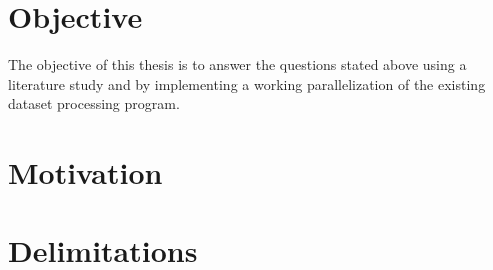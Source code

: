 \section{Objective}
The objective of this thesis is to answer the questions stated above using a literature study and by implementing a working parallelization
of the existing dataset processing program.

\section{Motivation}

\section{Delimitations}

